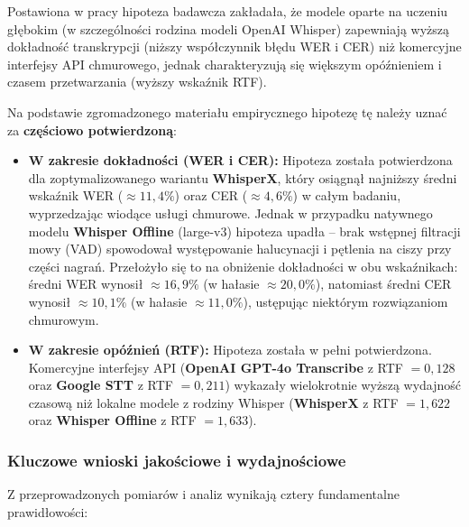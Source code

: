Postawiona w pracy hipoteza badawcza zakładała, że modele oparte na uczeniu głębokim (w szczególności rodzina modeli OpenAI Whisper) zapewniają wyższą dokładność transkrypcji (niższy współczynnik błędu WER i CER) niż komercyjne interfejsy API chmurowego, jednak charakteryzują się większym opóźnieniem i czasem przetwarzania (wyższy wskaźnik RTF).

Na podstawie zgromadzonego materiału empirycznego hipotezę tę należy uznać za \textbf{częściowo potwierdzoną}:

\begin{itemize}
    \item \textbf{W zakresie dokładności (WER i CER):} Hipoteza została potwierdzona dla zoptymalizowanego wariantu \textbf{WhisperX}, który osiągnął najniższy średni wskaźnik WER ($\approx 11{,}4\%$) oraz CER ($\approx 4{,}6\%$) w całym badaniu, wyprzedzając wiodące usługi chmurowe. Jednak w przypadku natywnego modelu \textbf{Whisper Offline} (large-v3) hipoteza upadła – brak wstępnej filtracji mowy (VAD) spowodował występowanie halucynacji i pętlenia na ciszy przy części nagrań. Przełożyło się to na obniżenie dokładności w obu wskaźnikach: średni WER wynosił $\approx 16{,}9\%$ (w hałasie $\approx 20{,}0\%$), natomiast średni CER wynosił $\approx 10{,}1\%$ (w hałasie $\approx 11{,}0\%$), ustępując niektórym rozwiązaniom chmurowym.
    \item \textbf{W zakresie opóźnień (RTF):} Hipoteza została w pełni potwierdzona. Komercyjne interfejsy API (\textbf{OpenAI GPT-4o Transcribe} z RTF $= 0{,}128$ oraz \textbf{Google STT} z RTF $= 0{,}211$) wykazały wielokrotnie wyższą wydajność czasową niż lokalne modele z rodziny Whisper (\textbf{WhisperX} z RTF $= 1{,}622$ oraz \textbf{Whisper Offline} z RTF $= 1{,}633$).
\end{itemize}

\subsubsection{Kluczowe wnioski jakościowe i wydajnościowe}
\label{subsubsec:key_findings}

Z przeprowadzonych pomiarów i analiz wynikają cztery fundamentalne prawidłowości:

